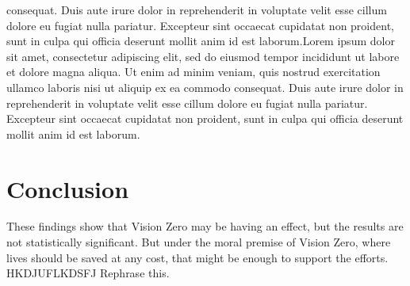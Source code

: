 \documentclass[10pt,journal,compsoc]{IEEEtran}
\begin{document}
consequat. Duis aute irure dolor in reprehenderit in voluptate velit esse cillum dolore eu fugiat nulla pariatur. Excepteur sint occaecat cupidatat non proident, sunt in culpa qui officia deserunt mollit anim id est laborum.Lorem ipsum dolor sit amet, consectetur adipiscing elit, sed do eiusmod tempor incididunt ut labore et dolore magna aliqua. Ut enim ad minim veniam, quis nostrud exercitation ullamco laboris nisi ut aliquip ex ea commodo consequat. Duis aute irure dolor in reprehenderit in voluptate velit esse cillum dolore eu fugiat nulla pariatur. Excepteur sint occaecat cupidatat non proident, sunt in culpa qui officia deserunt mollit anim id est laborum.

\section{Conclusion}
These findings show that Vision Zero may be having an effect, but the results are not statistically significant.  But under the moral premise of Vision Zero, where lives should be saved at any cost, that might be enough to support the efforts.  HKDJUFLKDSFJ Rephrase this.




%


\appendices
\end{document}
